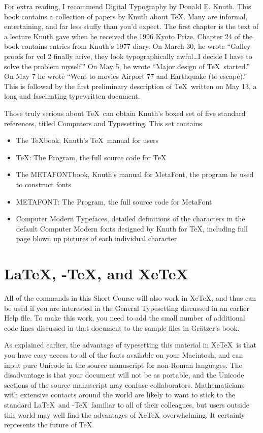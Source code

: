 \documentclass[11pt, oneside]{amsart}
\begin{document}
\begin{multicols}{2}
For extra reading, I recommend
Digital Typography by Donald E. Knuth. 
This book contains a collection of papers by Knuth about \TeX. Many are informal, entertaining, and far less stuffy than you'd expect. The first chapter is the text of a lecture Knuth gave when he received the 1996 Kyoto Prize. Chapter 24 of the book contains entries from Knuth's 1977 diary. On March 30, he wrote ``Galley proofs for vol 2 finally arive, they look typographically awful\ldots I decide I have to solve the problem myself.'' On May 5, he wrote ``Major design of \TeX\ started.'' On May 7 he wrote ``Went to movies Airport 77 and Earthquake (to escape).'' This is followed by the first preliminary description of \TeX\ written on May 13, a long and fascinating typewritten document.

Those truly serious about \TeX\  can obtain Knuth's boxed set of five standard references, titled Computers and Typesetting.
 This set contains
\begin{itemize}
\item The \TeX book, Knuth's \TeX\ manual for users
\item \TeX: The Program, the full source code for \TeX
\item The METAFONTbook, Knuth's manual for MetaFont, the program he used to construct fonts
\item METAFONT: The Program, the full source code for MetaFont
\item Computer Modern Typefaces, detailed definitions of the characters in the default Computer Modern fonts designed by Knuth for  \TeX, including full page blown up pictures of each individual character
\end{itemize}

\section{\LaTeX, \AmS-\TeX, and Xe\TeX}
All of the commands in this Short Course will also work in XeTeX, and thus can be used if you are interested in the General Typesetting discussed in an earlier Help file. To make this work, you need to add the small number of additional code lines discussed in that document to the sample files in Gr\"atzer's book.

As explained earlier, the advantage of typesetting this material in Xe\TeX\ is that you have easy access to all of the fonts available on your Macintosh, and can input pure Unicode in the source manuscript for non-Roman languages. The disadvantage is that your document will not be as portable, and the Unicode sections of the source manuscript may confuse collaborators. Mathematicians with extensive contacts around the world are likely to want to stick to the standard \LaTeX\ and \AmS-\TeX\ familiar to all of their colleagues, but users outside this world may well find the advantages of Xe\TeX\ overwhelming. It certainly represents the future of \TeX.


\end{multicols}
\end{document}
